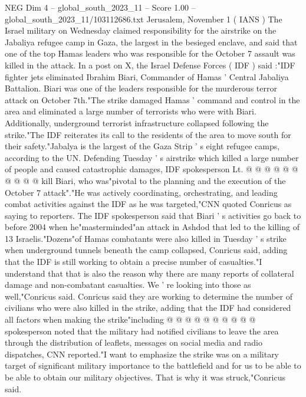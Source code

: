 \begin{textsample}{NEG Dim 4 – global\_south\_2023\_11 – Score 1.00 – global\_south\_2023\_11/103112686.txt}  \label{ex:f4_neg_307}
Jerusalem, November 1 ( IANS ) The Israel military on Wednesday claimed responsibility for the airstrike on the Jabaliya refugee camp in Gaza, the largest in the besieged enclave, and said that one of the top Hamas leaders who was responsible for the October 7 assault was killed in the attack.
In a post on X, the Israel Defense Forces ( IDF ) said :"IDF fighter jets eliminated Ibrahim Biari, Commander of Hamas ' Central Jabaliya Battalion.
Biari was one of the leaders responsible for the murderous terror attack on October 7th."The strike damaged Hamas ' command and control in the area and eliminated a large number of terrorists who were with Biari.
Additionally, underground terrorist infrastructure collapsed following the strike."The IDF reiterates its call to the residents of the area to move south for their safety."Jabalya is the largest of the Gaza Strip ' s eight refugee camps, according to the UN.
Defending Tuesday ' s airstrike which killed a large number of people and caused catastrophic damages, IDF spokesperson Lt. @ @ @ @ @ @ @ @ @ @ kill Biari, who was"pivotal to the planning and the execution of the October 7 attack"."He was actively coordinating, orchestrating, and leading combat activities against the IDF as he was targeted,"CNN quoted Conricus as saying to reporters.
The IDF spokesperson said that Biari ' s activities go back to before 2004 when he"masterminded"an attack in Ashdod that led to the killing of 13 Israelis."Dozens"of Hamas combatants were also killed in Tuesday ' s strike when underground tunnels beneath the camp collapsed, Conricus said, adding that the IDF is still working to obtain a precise number of casualties."I understand that that is also the reason why there are many reports of collateral damage and non-combatant casualties.
We ' re looking into those as well,"Conricus said.
Conricus said they are working to determine the number of civilians who were also killed in the strike, adding that the IDF had considered all factors when making the strike"including @ @ @ @ @ @ @ @ @ @ spokesperson noted that the military had notified civilians to leave the area through the distribution of leaflets, messages on social media and radio dispatches, CNN reported."I want to emphasize the strike was on a military target of significant military importance to the battlefield and for us to be able to be able to obtain our military objectives.
That is why it was struck,"Conricus said.

\end{textsample}
